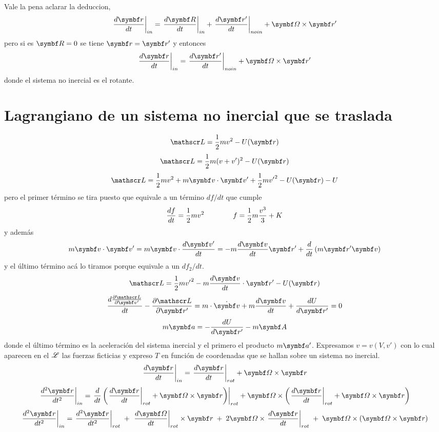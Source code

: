 \documentclass[10pt,oneside]{CBFT_book}
\begin{document}
Vale la pena aclarar la deduccion,
\[
	\left. \dtot{\vb{r}}{t} \right|_{in} = \left. \dtot{\vb{R}}{t} \right|_{in} + \left. \dtot{\vb{r}'}{t} \right|_{no in}
	+ \vb{\Omega} \times \vb{r}' 
\]
pero si es $\vb{R}=0$ se tiene $\vb{r}=\vb{r}'$ y entonces
\[
	\left. \dtot{\vb{r}}{t} \right|_{in} =  \left. \dtot{\vb{r}'}{t} \right|_{no in} + \vb{\Omega} \times \vb{r}' 
\]
donde el sistema no inercial es el rotante.

\section{Lagrangiano de un sistema no inercial que se traslada}

\[
	\Lag = \frac{1}{2} m v^2 - U(\vb{r})
\]
\[
	\Lag = \frac{1}{2} m ( v + v' )^2 - U(\vb{r})
\]
\[
	\Lag = \frac{1}{2} m  v^2 + m \vb{v}\cdot\vb{v}' +\frac{1}{2} m {v'}^2 - U(\vb{r}) - U
\]
pero el primer término se  tira puesto que equivale a un término $df/dt$ que cumple 
\[
	\frac{d^{\hspace{-0.05em}} {f}}{d {t}^{\hspace{-0.05em}}} = \frac{1}{2} m  v^2 \qquad \qquad f = \frac{1}{2} m  \frac{v^3}{3} + K
\]
y además 
\[
	 m \vb{v}\cdot\vb{v}' =  m \vb{v}\cdot \dtot{\vb{v}'}{t} = - m \dtot{\vb{v}}{t} \vb{r}' 
				+ \frac{d}{dt}\left( m \vb{r}' \vb{v} \right)
\]
y el último término acá lo tiramos porque equivale a un $df_2/dt$.
\[
	\Lag = \frac{1}{2} m {v'}^2 - m \dtot{\vb{v}}{t}\cdot\vb{r}' - U(\vb{r})
\]
\[
	\dtot{\dpar{\Lag}{\vb{v}'}}{t} -\dpar{\Lag}{\vb{r}'} =
		m\cdot\dot{\vb{v}} + m \dtot{\vb{v}}{t} + \dtot{U}{\vb{r}'} = 0
\]
\[
	m \vb{a} = -\dtot{U}{\vb{r}'} - m \vb{A}
\]
donde el último término es la aceleración del sistema inercial y el primero el producto $m\vb{a}'$.
Expresamos $v=v(V,v')$ con lo cual aparecen en el $\mathscr{L}$ las fuerzas ficticias y expreso $T$ en 
función de coordenadas que se hallan sobre un sistema no inercial.
\[
	\left. \dtot{\vb{r}}{t} \right|_{in} = \left. \dtot{\vb{r}}{t} \right|_{rot} + \vb{\Omega} \times \vb{r}
\]
\[
	\left. \dtot[2]{\vb{r}}{t} \right|_{in} = 
	\left. \frac{d}{dt}\left( \left. \dtot{\vb{r}}{t} \right|_{rot} + \vb{\Omega} \times \vb{r} \right) \right|_{rot}
	+ \vb{\Omega} \times \left( \left. \dtot{\vb{r}}{t} \right|_{rot} + \vb{\Omega} \times \vb{r} \right)
\]
\[
	\left. \dtot[2]{\vb{r}}{t} \right|_{in} = 
	\left. \dtot[2]{\vb{r}}{t} \right|_{rot}  \; +  \; \left.\dtot{\vb{\Omega}}{t}\right|_{rot} \times \vb{r}
	 \;  + \; 2 \vb{\Omega} \times \left. \dtot{\vb{r}}{t} \right|_{rot} 
	 \;  + \;  \vb{\Omega} \times \left( \vb{\Omega} \times \vb{r} \right)
\]
\end{document}
